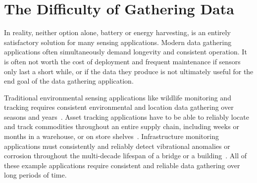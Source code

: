 

\section{The Difficulty of Gathering Data}
In reality, neither option alone, battery or energy harvesting, is an entirely satisfactory solution for many sensing applications. 
Modern data gathering applications often simultaneously demand longevity and consistent operation.
It is often not worth the cost of deployment and frequent maintenance if sensors only last a short while, or if the data they produce is not ultimately useful for the end goal of the data gathering application.

Traditional environmental sensing applications like wildlife monitoring and tracking requires consistent environmental and location data gathering over seasons and years~\cite{mainwaring2002wireless,juang2002energy}.
Asset tracking applications have to be able to reliably locate and track commodities throughout an entire supply chain, including weeks or months in a warehouse, or on store shelves~\cite{williotpixel}.
Infrastructure monitoring applications must consistently and reliably detect vibrational anomalies or corrosion throughout the multi-decade lifespan of a bridge or a building~\cite{afanasov2020battery,jagtap2021repurposing}.
All of these example applications require consistent and reliable data gathering over long periods of time.

